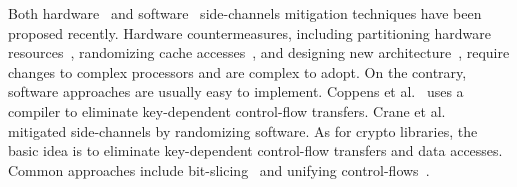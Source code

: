 Both hardware~\cite{Page2005PartitionedCA,
    Wang:2007:NCD:1250662.1250723,Zhang:2015:HDL:2775054.2694372,Li:2014:SLH:2541940.2541947,
    236344, 236334} and software~\cite{shih2017t,Coppens:2009:PMT:1607723.1608124,
    brickell2006software,crane2015thwarting, 197207} side-channels mitigation techniques have
been proposed recently. Hardware countermeasures, including partitioning hardware resources~\cite{Page2005PartitionedCA}, randomizing cache
accesses~\cite{Wang:2007:NCD:1250662.1250723, 236344}, and designing new
architecture~\cite{tiwari2011crafting}, require changes to complex processors and are complex to adopt. On the contrary, software approaches are
usually easy to implement. Coppens et
al.~\cite{Coppens:2009:PMT:1607723.1608124} uses a compiler
to eliminate key-dependent control-flow transfers. Crane et
al.~\cite{crane2015thwarting} mitigated side-channels by randomizing software.
As for crypto libraries, the basic idea is to eliminate key-dependent
control-flow transfers and data accesses. Common approaches include
bit-slicing~\cite{konighofer2008fast,rebeiro2006bitslice} and unifying
control-flows~\cite{Coppens:2009:PMT:1607723.1608124}.

